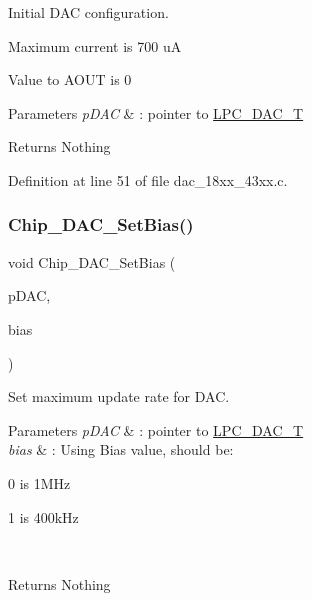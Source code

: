 Initial D\+AC configuration. 


\begin{DoxyItemize}
\item Maximum current is 700 uA
\item Value to A\+O\+UT is 0 
\begin{DoxyParams}{Parameters}
{\em p\+D\+AC} & \+: pointer to \hyperlink{struct_l_p_c___d_a_c___t}{L\+P\+C\+\_\+\+D\+A\+C\+\_\+T} \\
\hline
\end{DoxyParams}
\begin{DoxyReturn}{Returns}
Nothing 
\end{DoxyReturn}

\end{DoxyItemize}

Definition at line 51 of file dac\+\_\+18xx\+\_\+43xx.\+c.

\mbox{\label{group___d_a_c__18_x_x__43_x_x_ga01352564a69b1286d45a65cf06a246f2}} 
\subsubsection{\texorpdfstring{Chip\+\_\+\+D\+A\+C\+\_\+\+Set\+Bias()}{Chip\_DAC\_SetBias()}}
{\footnotesize\ttfamily void Chip\+\_\+\+D\+A\+C\+\_\+\+Set\+Bias (\begin{DoxyParamCaption}\item[{\hyperlink{struct_l_p_c___d_a_c___t}{L\+P\+C\+\_\+\+D\+A\+C\+\_\+T} $\ast$}]{p\+D\+AC,  }\item[{uint32\+\_\+t}]{bias }\end{DoxyParamCaption})}



Set maximum update rate for D\+AC. 


\begin{DoxyParams}{Parameters}
{\em p\+D\+AC} & \+: pointer to \hyperlink{struct_l_p_c___d_a_c___t}{L\+P\+C\+\_\+\+D\+A\+C\+\_\+T} \\
\hline
{\em bias} & \+: Using Bias value, should be\+:
\begin{DoxyItemize}
\item 0 is 1\+M\+Hz
\item 1 is 400k\+Hz 
\end{DoxyItemize}\\
\hline
\end{DoxyParams}
\begin{DoxyReturn}{Returns}
Nothing 
\end{DoxyReturn}


